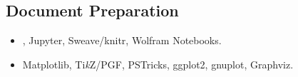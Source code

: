 \documentclass[version=last, paper=A4, DIV=12, toc=bibliography]{scrartcl}%
\begin{document}
\subsection*{Document Preparation}\label{subsec:document-preparation}

\begin{itemize}[leftmargin=*]
\item {}, Jupyter, Sweave/knitr, Wolfram Notebooks.%
\item Matplotlib, Ti\emph{k}Z/PGF, PSTricks, ggplot2, gnuplot, Graphviz.
\end{itemize}

\printbibliography[title=Publications]
\end{document}
